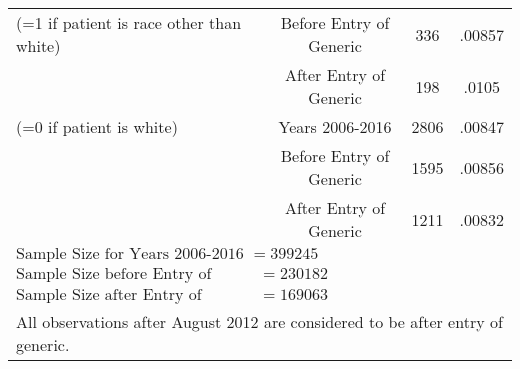 \begin{tabular}{l*{3}{c}}
(=1 if patient is race other than white)                &     Before Entry of Generic&     336&      .00857\\
                                                        &     After Entry of Generic&      198&      .0105\\
[.5em]
(=0 if patient is white)                                &     Years 2006-2016&             2806&      .00847\\
                                                        &     Before Entry of Generic&     1595&      .00856\\
                                                        &     After Entry of Generic&      1211&      .00832\\
\hline
$\text{Sample Size for Years 2006-2016 }= 399245$\\
$\text{Sample Size before Entry of Generic} = 230182$\\
$\text{Sample Size after Entry of Generic} = 169063$\\
\hline\hline
\multicolumn{4}{l}{\footnotesize All observations after August 2012 are considered to be after entry of generic.}\\
\end{tabular}


